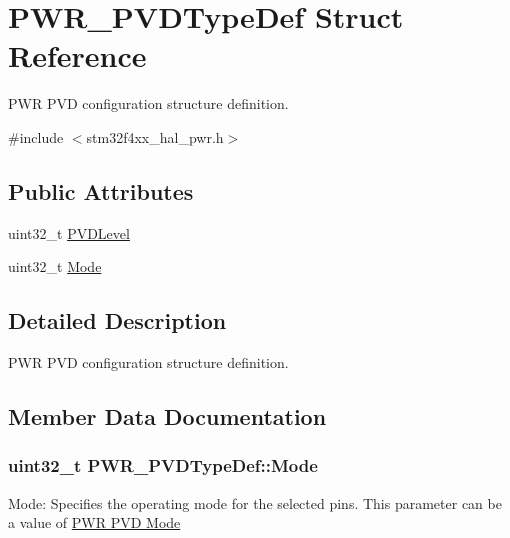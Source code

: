 \hypertarget{struct_p_w_r___p_v_d_type_def}{}\section{P\+W\+R\+\_\+\+P\+V\+D\+Type\+Def Struct Reference}
\label{struct_p_w_r___p_v_d_type_def}


P\+WR P\+VD configuration structure definition.  




{\ttfamily \#include $<$stm32f4xx\+\_\+hal\+\_\+pwr.\+h$>$}

\subsection*{Public Attributes}
\begin{DoxyCompactItemize}
\item 
uint32\+\_\+t \hyperlink{struct_p_w_r___p_v_d_type_def_a540471bc6ac947fd8bc2c87f61d9faab}{P\+V\+D\+Level}
\item 
uint32\+\_\+t \hyperlink{struct_p_w_r___p_v_d_type_def_af692d691f0cb5871b319fd371fab34d8}{Mode}
\end{DoxyCompactItemize}


\subsection{Detailed Description}
P\+WR P\+VD configuration structure definition. 

\subsection{Member Data Documentation}
\subsubsection[{\texorpdfstring{Mode}{Mode}}]{\setlength{\rightskip}{0pt plus 5cm}uint32\+\_\+t P\+W\+R\+\_\+\+P\+V\+D\+Type\+Def\+::\+Mode}\hypertarget{struct_p_w_r___p_v_d_type_def_af692d691f0cb5871b319fd371fab34d8}{}\label{struct_p_w_r___p_v_d_type_def_af692d691f0cb5871b319fd371fab34d8}
Mode\+: Specifies the operating mode for the selected pins. This parameter can be a value of \hyperlink{group___p_w_r___p_v_d___mode}{P\+WR P\+VD Mode} 
